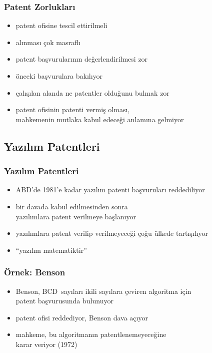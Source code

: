 \documentclass[dvipsnames]{beamer}
\theoremstyle{plain}
\begin{document}
\begin{frame}
  \frametitle{Patent Zorlukları}

  \begin{itemize}
    \item patent ofisine tescil ettirilmeli
    \item alınması çok masraflı

    \pause
    \medskip
    \item patent başvurularının değerlendirilmesi zor
    \item önceki başvurulara bakılıyor

    \pause
    \medskip
    \item çalışılan alanda ne patentler olduğunu bulmak zor

    \pause
    \medskip
    \item patent ofisinin patenti vermiş olması,\\
      mahkemenin mutlaka kabul edeceği anlamına gelmiyor
  \end{itemize}
\end{frame}

\subsection{Yazılım Patentleri}

\begin{frame}
  \frametitle{Yazılım Patentleri}

  \begin{itemize}
    \item ABD'de 1981'e kadar yazılım patenti başvuruları reddediliyor
    \item bir davada kabul edilmesinden sonra\\
      yazılımlara patent verilmeye başlanıyor

    \pause
    \medskip
    \item yazılımlara patent verilip verilmeyeceği çoğu ülkede tartışılıyor
    \item ``yazılım matematiktir''
  \end{itemize}
\end{frame}

\begin{frame}
  \frametitle{Örnek: Benson}

  \begin{itemize}
    \item Benson, BCD~sayıları ikili sayılara çeviren algoritma için\\
      patent başvurusunda bulunuyor
    \item patent ofisi reddediyor, Benson dava açıyor
    \item mahkeme, bu algoritmanın patentlenemeyeceğine\\
      karar veriyor (1972)
  \end{itemize}
\end{frame}
\end{document}
